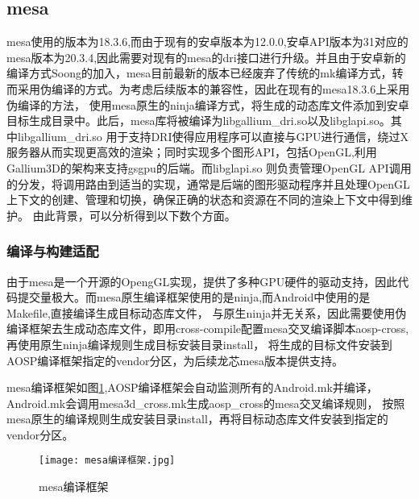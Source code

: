 \subsection{mesa}
mesa使用的版本为18.3.6,而由于现有的安卓版本为12.0.0,安卓API版本为31对应的mesa版本为20.3.4,因此需要对现有的mesa的dri接口进行升级。并且由于安卓新的
编译方式Soong的加入，mesa目前最新的版本已经废弃了传统的mk编译方式，转而采用伪编译的方式。为考虑后续版本的兼容性，因此在现有的mesa18.3.6上采用伪编译的方法，
使用mesa原生的ninja编译方式，将生成的动态库文件添加到安卓目标生成目录中。此后，mesa库将被编译为libgallium\_dri.so以及libglapi.so。其中libgallium\_dri.so
用于支持DRI使得应用程序可以直接与GPU进行通信，绕过X服务器从而实现更高效的渲染；同时实现多个图形API，包括OpenGL,利用Gallium3D的架构来支持gsgpu的后端。而libglapi.so
则负责管理OpenGL API调用的分发，将调用路由到适当的实现，通常是后端的图形驱动程序并且处理OpenGL上下文的创建、管理和切换，确保正确的状态和资源在不同的渲染上下文中得到维护。
由此背景，可以分析得到以下数个方面。

\subsubsection{编译与构建适配}
由于mesa是一个开源的OpengGL实现，提供了多种GPU硬件的驱动支持，因此代码提交量极大。而mesa原生编译框架使用的是ninja,而Android中使用的是Makefile,直接编译生成目标动态库文件，
与原生ninja并无关系，因此需要使用伪编译框架去生成动态库文件，即用cross-compile配置mesa交叉编译脚本aosp-cross,再使用原生ninja编译规则生成目标安装目录install，
将生成的目标文件安装到AOSP编译框架指定的vendor分区，为后续龙芯mesa版本提供支持。

mesa编译框架如图\ref{fig:mesa编译框架},AOSP编译框架会自动监测所有的Android.mk并编译，Android.mk会调用mesa3d\_cross.mk生成aosp\_cross的mesa交叉编译规则，
按照mesa原生的编译规则生成安装目录install，再将目标动态库文件安装到指定的vendor分区。
\begin{figure}[h]
  \centering
  \texttt{[image: mesa编译框架.jpg]}
  \caption{mesa编译框架}
  \label{fig:mesa编译框架}
\end{figure}



